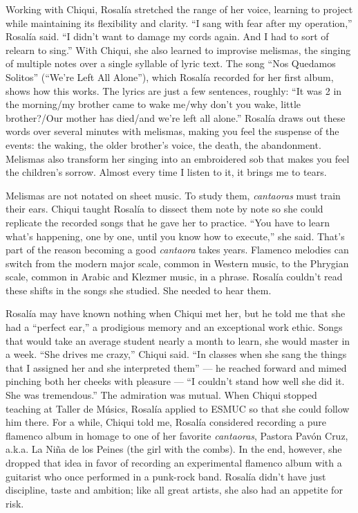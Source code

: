 Working with Chiqui, Rosalía stretched the range of her voice, learning
to project while maintaining its flexibility and clarity. ``I sang with
fear after my operation,'' Rosalía said. ``I didn't want to damage my
cords again. And I had to sort of relearn to sing.'' With Chiqui, she
also learned to improvise melismas, the singing of multiple notes over a
single syllable of lyric text. The song ``Nos Quedamos Solitos''
(``We're Left All Alone''), which Rosalía recorded for her first album,
shows how this works. The lyrics are just a few sentences, roughly: ``It
was 2 in the morning/my brother came to wake me/why don't you wake,
little brother?/Our mother has died/and we're left all alone.'' Rosalía
draws out these words over several minutes with melismas, making you
feel the suspense of the events: the waking, the older brother's voice,
the death, the abandonment. Melismas also transform her singing into an
embroidered sob that makes you feel the children's sorrow. Almost every
time I listen to it, it brings me to tears.

Melismas are not notated on sheet music. To study them, \emph{cantaoras}
must train their ears. Chiqui taught Rosalía to dissect them note by
note so she could replicate the recorded songs that he gave her to
practice. ``You have to learn what's happening, one by one, until you
know how to execute,'' she said. That's part of the reason becoming a
good \emph{cantaora} takes years. Flamenco melodies can switch from the
modern major scale, common in Western music, to the Phrygian scale,
common in Arabic and Klezmer music, in a phrase. Rosalía couldn't read
these shifts in the songs she studied. She needed to hear them.

Rosalía may have known nothing when Chiqui met her, but he told me that
she had a ``perfect ear,'' a prodigious memory and an exceptional work
ethic. Songs that would take an average student nearly a month to learn,
she would master in a week. ``She drives me crazy,'' Chiqui said. ``In
classes when she sang the things that I assigned her and she interpreted
them'' --- he reached forward and mimed pinching both her cheeks with
pleasure --- ``I couldn't stand how well she did it. She was
tremendous.'' The admiration was mutual. When Chiqui stopped teaching at
Taller de Músics, Rosalía applied to ESMUC so that she could follow him
there. For a while, Chiqui told me, Rosalía considered recording a pure
flamenco album in homage to one of her favorite \emph{cantaoras},
Pastora Pavón Cruz, a.k.a. La Niña de los Peines (the girl with the
combs). In the end, however, she dropped that idea in favor of recording
an experimental flamenco album with a guitarist who once performed in a
punk-rock band. Rosalía didn't have just discipline, taste and ambition;
like all great artists, she also had an appetite for risk.

